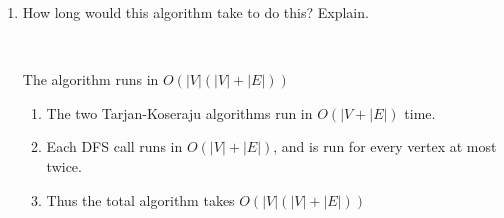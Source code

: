\documentclass[12pt, letterpaper]{article}
\begin{document}
\begin{enumerate}
\begin{enumerate}
\begin {enumerate}
\end {enumerate}

\-\ \newline
\item How long would this algorithm take to do this?  Explain.  

\-\ \newline

The algorithm runs in \(O( |V| (|V| + |E|) )\)

\begin {enumerate}
\item The two Tarjan-Koseraju algorithms run in \(O(|V + |E|)\) time.
\item Each DFS call runs in \(O(|V| + |E|)\), and is run for every vertex at most twice. 
\item Thus the total algorithm takes \(O(|V|(|V| + |E|))\)
\end {enumerate}

\end{enumerate}


\end{enumerate}
\end{document}
